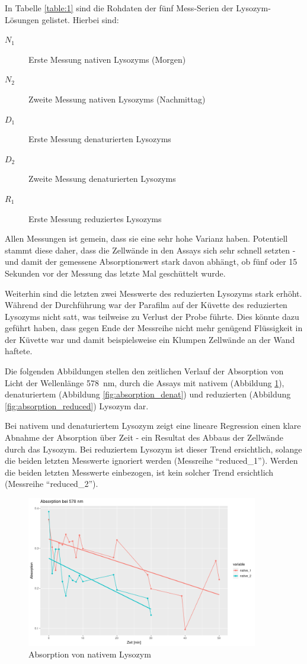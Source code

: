 \documentclass[a4paper,german]{scrreprt}
\begin{document}
In Tabelle \ref{table:1} sind die Rohdaten der fünf Mess-Serien der Lysozym-Lösungen gelistet. Hierbei sind:
\begin{description}
	\item[$N_1$] Erste Messung nativen Lysozyms (Morgen)
	\item[$N_2$] Zweite Messung nativen Lysozyms (Nachmittag)
	\item[$D_1$] Erste Messung denaturierten Lysozyms
	\item[$D_2$] Zweite Messung denaturierten Lysozyms
	\item[$R_1$] Erste Messung reduziertes Lysozyms
\end{description}

Allen Messungen ist gemein, dass sie eine sehr hohe Varianz haben. Potentiell
stammt diese daher, dass die Zellwände in den Assays sich sehr schnell setzten
- und damit der gemessene Absorptionswert stark davon abhängt, ob fünf oder 15
Sekunden vor der Messung das letzte Mal geschüttelt wurde.

Weiterhin sind die letzten zwei Messwerte des reduzierten Lysozyms stark
erhöht. Während der Durchführung war der Parafilm auf der Küvette des
reduzierten Lysozyms nicht satt, was teilweise zu Verlust der Probe führte.
Dies könnte dazu geführt haben, dass gegen Ende der Messreihe nicht mehr
genügend Flüssigkeit in der Küvette war und damit beispielsweise ein Klumpen
Zellwände an der Wand haftete.

Die folgenden Abbildungen stellen den zeitlichen Verlauf der Absorption von Licht der Wellenlänge \SI{578}{nm}, durch die Assays mit nativem (Abbildung \ref{fig:absorption_native}), denaturiertem (Abbildung \ref{fig:absorption_denat}) und reduzierten (Abbildung \ref{fig:absorption_reduced}) Lysozym dar.

Bei nativem und denaturiertem Lysozym zeigt eine lineare Regression einen klare
Abnahme der Absorption über Zeit - ein Resultat des Abbaus der Zellwände durch
das Lysozym. Bei reduziertem Lysozym ist dieser Trend ersichtlich, solange die
beiden letzten Messwerte ignoriert werden (Messreihe ``reduced\_1''). Werden
die beiden letzten Messwerte einbezogen, ist kein solcher Trend ersichtlich
(Messreihe ``reduced\_2'').

\begin{figure}[h]
	\centering
	\includegraphics[width=0.9\textwidth]{data/absorption_nativ}
	\caption{Absorption von nativem Lysozym}
	\label{fig:absorption_native}
\end{figure}
\end{document}
